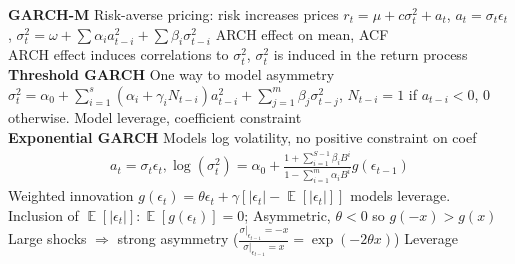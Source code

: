 \documentclass[10pt,landscape, a4paper]{article}
\theoremstyle{remark}
\newcommand{\E}{\operatorname{\mathbb{E}}}
\newcommand{\abs}[1]{\left\lvert #1 \right\rvert}
\begin{document}
\begin{multicols*}{3}
\textbf{GARCH-M} Risk-averse pricing: risk increases prices $r_t = \mu + c\sigma^2_t + a_t$, $a_t = \sigma_t \epsilon_t$, $\sigma^2_t = \omega + \sum \alpha_i a^2_{t-i} +\sum \beta_i \sigma^2_{t-i} $ ARCH effect on mean, ACF\\
ARCH effect induces correlations to $\sigma^2_t$, $\sigma^2_t$ is induced in the return process\\

\textbf{Threshold GARCH} One way to model asymmetry $\sigma^2_t = \alpha_0 + \sum^s_{i=1} (\alpha_i + \gamma_i N_{t-i})a_{t-i}^2 + \sum^m_{j=1} \beta_j \sigma^2_{t-j} $, $N_{t-i} = 1$ if $a_{t-i} < 0$, $0$ otherwise. Model leverage, coefficient constraint\\
\textbf{Exponential GARCH} Models log volatility, no positive constraint on coef
\begin{align*}
    a_t = \sigma_t \epsilon_t, \log (\sigma^2_t) = \alpha_0 + \frac{1+\sum^{S-1}_{i=1} \beta_i B^i }{1- \sum^m_{i=1}\alpha_i B^i } g(\epsilon_{t-1})
\end{align*}
Weighted innovation $g(\epsilon_t) = \theta \epsilon_t + \gamma [\abs{\epsilon_t} - \E [\abs{\epsilon_t}]]$ models leverage.\\
Inclusion of $\E [\abs{\epsilon_t}]: \E [g(\epsilon_t)] =0$; Asymmetric, $\theta<0$ so $g(-x) > g(x)$\\
Large shocks $\Rightarrow$ strong asymmetry ($\frac{\sigma \lvert_{\epsilon_{t-1}} = -x}{\sigma \lvert_{\epsilon_{t-1}} = x} = \exp(-2\theta x)$)  Leverage\\


\end{multicols*}
\end{document}

